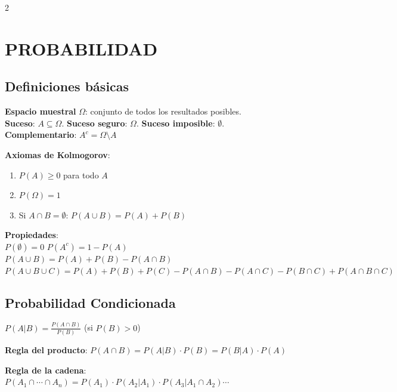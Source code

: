 \documentclass[9pt,a4paper]{article}
\begin{document}
\begin{multicols}{2}

\section{PROBABILIDAD}

\subsection{Definiciones básicas}
\textbf{Espacio muestral} $\Omega$: conjunto de todos los resultados posibles.\\
\textbf{Suceso}: $A\subseteq\Omega$. \quad \textbf{Suceso seguro}: $\Omega$. \quad \textbf{Suceso imposible}: $\emptyset$.\\
\textbf{Complementario}: $A^c=\Omega\setminus A$

\textbf{Axiomas de Kolmogorov}:
\begin{enumerate}[leftmargin=*]
\item $P(A)\geq 0$ para todo $A$
\item $P(\Omega)=1$
\item Si $A\cap B=\emptyset$: $P(A\cup B)=P(A)+P(B)$
\end{enumerate}

\begin{formulabox}
\textbf{Propiedades}:\\
$P(\emptyset)=0$ \quad $P(A^c)=1-P(A)$\\
$P(A\cup B)=P(A)+P(B)-P(A\cap B)$\\
$P(A\cup B\cup C)=P(A)+P(B)+P(C)-P(A\cap B)-P(A\cap C)-P(B\cap C)+P(A\cap B\cap C)$
\end{formulabox}

\subsection{Probabilidad Condicionada}
\begin{formulabox}
$P(A|B)=\frac{P(A\cap B)}{P(B)}$ \quad (si $P(B)>0$)
\end{formulabox}

\textbf{Regla del producto}: $P(A\cap B)=P(A|B)\cdot P(B)=P(B|A)\cdot P(A)$

\textbf{Regla de la cadena}:\\
$P(A_1\cap\cdots\cap A_n)=P(A_1)\cdot P(A_2|A_1)\cdot P(A_3|A_1\cap A_2)\cdots$


\end{multicols}
\end{document}
